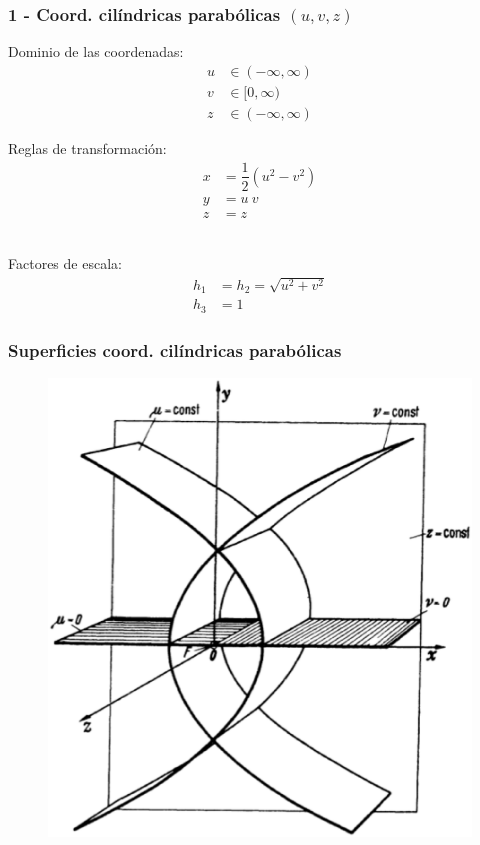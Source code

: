 \documentclass[12pt]{beamer}
\begin{document}
\begin{frame}
\frametitle{1 - Coord. cilíndricas parabólicas $(u, v, z)$}
\fontsize{12}{12}\selectfont
\begin{minipage}{0.45\textwidth}
Dominio de las coordenadas:
\pause
\begin{align*}
u &\in (-\infty,\infty) \\
v &\in [0,\infty) \\
z &\in(-\infty,\infty)
\end{align*}
\end{minipage}
\hspace{1cm}
\pause
\begin{minipage}{0.4\textwidth}
Reglas de transformación:
\pause
\begin{align*}
x &= \dfrac{1}{2}(u^{2 } -v^{2}) \\
y &= u \: v \\
z &=z
\end{align*}
\end{minipage}
\\
\bigskip
\pause
Factores de escala:
\pause
\begin{align*}
h_{1 } &= h_{2} = \sqrt{u^{2 } +v^{2}} \\
h_{3 } &= 1
\end{align*}
\end{frame}
\begin{frame}
\frametitle{Superficies coord. cilíndricas parabólicas}
\begin{figure}[H]
  \centering
  \includegraphics[scale=0.3]{Imagenes/Sistema_Cilindrico_Parabolico.eps}
\end{figure}
\end{frame}
\end{document}
